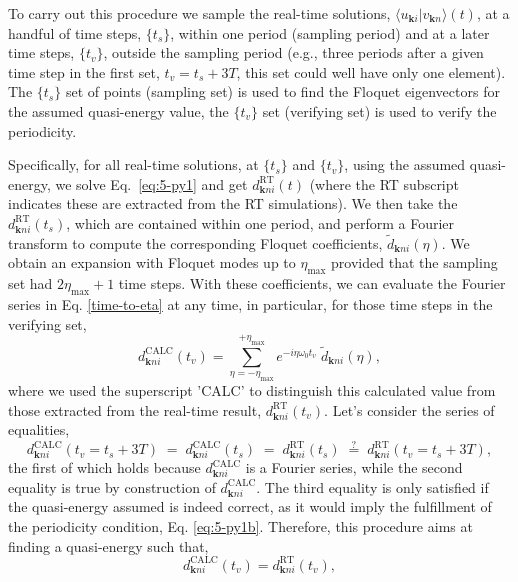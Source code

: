 \documentclass[aps,physrev,preprint,groupedaddress]{revtex4-2}
\newcommand{\kpt}{\mathbf{k}}
\newcommand{\tdKS}{|v_{\mathbf{k}n}\rangle}
\newcommand{\dFKS}{\widetilde{d}_{\kpt ni}(\eta) }
\renewcommand{\[}{\left[}
\renewcommand{\]}{\right]}
\renewcommand{\(}{\left(}
\renewcommand{\)}{\right)}
\begin{document}
To carry out this procedure we sample the real-time solutions, $\langle u_{\mathbf{k}i} \tdKS(t)$, at a handful of time steps, $\{t_s\}$, within one period (sampling period) and at a later time steps, $\{t_v\}$, outside the sampling period (e.g., three periods after a given time step in the first set, $t_v = t_s+3T$, this set could well have only one element). 
The $\{t_s\}$ set of points (sampling set) is used to find the Floquet eigenvectors for the assumed quasi-energy value, the $\{t_v\}$ set (verifying set) is used to verify the periodicity.   
 
Specifically, for all real-time solutions, at $\{t_s\}$ and $\{t_v\}$, using the assumed quasi-energy, we solve Eq.~\ref{eq:5-py1} and get $d^\text{RT}_{\kpt ni}(t)$ (where the RT subscript indicates these are extracted from the RT simulations).  
We then take the $d_{\kpt ni}^\text{RT}(t_s)$, which are contained within one period, and perform a Fourier transform to compute the corresponding Floquet coefficients, $\dFKS$. We obtain an expansion with Floquet modes up to $\eta_\text{max}$ provided that the sampling set had $2\eta_\text{max}+1$ time steps. With these coefficients, we can evaluate the Fourier series in Eq. \ref{time-to-eta} at any time, in particular, for those time steps in the verifying set, 
\begin{equation}
    \label{eq:5-py3}
    d_{\kpt ni}^\text{CALC}(t_v) = \sum_{\eta=-\eta_\text{max}}^{+\eta_\text{max}}{ e^{-i\eta\omega_0t_v} \; \dFKS},
\end{equation}
where we used the superscript 'CALC' to distinguish this calculated value from those extracted from the real-time result, $d_{\kpt ni}^\text{RT}(t_v)$. Let's consider the series of equalities,
\begin{equation}
    \label{eq:5-py3b}
    d_{\kpt ni}^\text{CALC}(t_v=t_s+3T) \;=\; 
    d_{\kpt ni}^\text{CALC}(t_s) \;=\; 
    d_{\kpt ni}^\text{RT}(t_s) \;\stackrel{?}{=}\;
    d_{\kpt ni}^\text{RT}(t_v=t_s+3T),
\end{equation}
the first of which holds because $d_{\kpt ni}^\text{CALC}$ is a Fourier series, while the second equality is true by construction of $d_{\kpt ni}^\text{CALC}$. The third equality is only satisfied if the quasi-energy assumed is indeed correct, as it would imply the fulfillment of the periodicity condition, Eq. \ref{eq:5-py1b}. Therefore, this procedure aims at finding a quasi-energy such that,
\begin{equation}\label{eq:5-py3c}
    d_{\kpt ni}^\text{CALC}(t_v)=d_{\kpt ni}^\text{RT}(t_v),
\end{equation}
\end{document}
